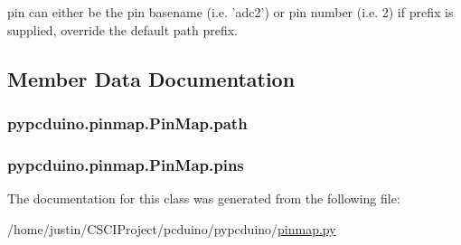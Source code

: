 pin can either be the pin basename (i.\-e. 'adc2') or pin number (i.\-e. 2) if prefix is supplied, override the default path prefix. 

\subsection{Member Data Documentation}
\hypertarget{classpypcduino_1_1pinmap_1_1_pin_map_a472b81fe48d6d7acbb1d4a637d870be9}{
\subsubsection[{path}]{\setlength{\rightskip}{0pt plus 5cm}pypcduino.\-pinmap.\-Pin\-Map.\-path}}\label{classpypcduino_1_1pinmap_1_1_pin_map_a472b81fe48d6d7acbb1d4a637d870be9}
\hypertarget{classpypcduino_1_1pinmap_1_1_pin_map_ade5e4f0ef3667e1b1cd2fd35af39029e}{
\subsubsection[{pins}]{\setlength{\rightskip}{0pt plus 5cm}pypcduino.\-pinmap.\-Pin\-Map.\-pins}}\label{classpypcduino_1_1pinmap_1_1_pin_map_ade5e4f0ef3667e1b1cd2fd35af39029e}


The documentation for this class was generated from the following file\-:\begin{DoxyCompactItemize}
\item 
/home/justin/\-C\-S\-C\-I\-Project/pcduino/pypcduino/\hyperlink{pinmap_8py}{pinmap.\-py}\end{DoxyCompactItemize}
